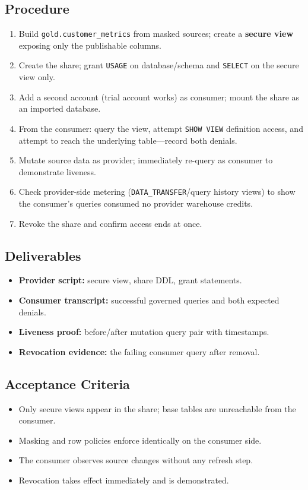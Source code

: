 \subsection*{Procedure}
\begin{enumerate}
    \item Build \texttt{gold.customer\_metrics} from masked sources; create a \textbf{secure view} exposing only the publishable columns.
    \item Create the share; grant \texttt{USAGE} on database/schema and \texttt{SELECT} on the secure view only.
    \item Add a second account (trial account works) as consumer; mount the share as an imported database.
    \item From the consumer: query the view, attempt \texttt{SHOW VIEW} definition access, and attempt to reach the underlying table---record both denials.
    \item Mutate source data as provider; immediately re-query as consumer to demonstrate liveness.
    \item Check provider-side metering (\texttt{DATA\_TRANSFER}/query history views) to show the consumer's queries consumed no provider warehouse credits.
    \item Revoke the share and confirm access ends at once.
\end{enumerate}

\subsection*{Deliverables}
\begin{itemize}
    \item \textbf{Provider script:} secure view, share DDL, grant statements.
    \item \textbf{Consumer transcript:} successful governed queries and both expected denials.
    \item \textbf{Liveness proof:} before/after mutation query pair with timestamps.
    \item \textbf{Revocation evidence:} the failing consumer query after removal.
\end{itemize}

\subsection*{Acceptance Criteria}
\begin{itemize}
    \item Only secure views appear in the share; base tables are unreachable from the consumer.
    \item Masking and row policies enforce identically on the consumer side.
    \item The consumer observes source changes without any refresh step.
    \item Revocation takes effect immediately and is demonstrated.
\end{itemize}

